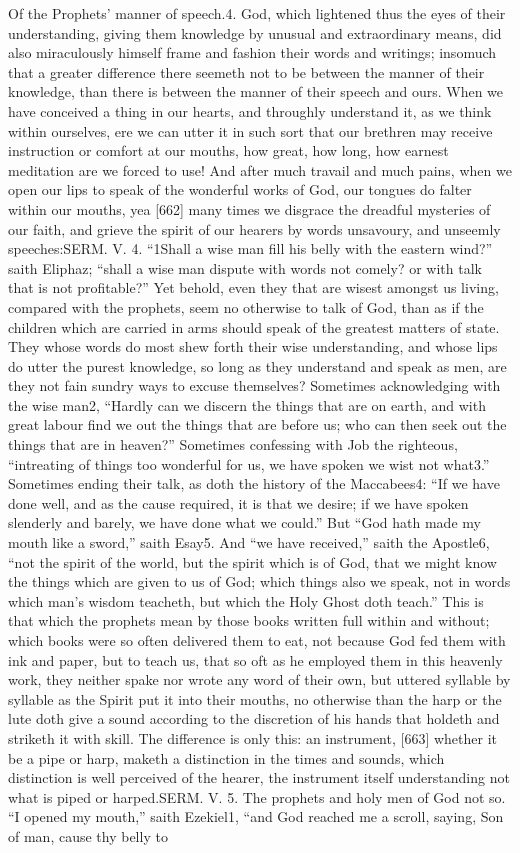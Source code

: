 Of the Prophets’ manner of speech.4. God, which lightened thus the eyes of their understanding, giving them knowledge by unusual and extraordinary means, did also miraculously himself frame and fashion their words and writings; insomuch that a greater difference there seemeth not to be between the manner of their knowledge, than there is between the manner of their speech and ours. When we have conceived a thing in our hearts, and throughly understand it, as we think within ourselves, ere we can utter it in such sort that our brethren may receive instruction or comfort at our mouths, how great, how long, how earnest meditation are we forced to use! And after much travail and much pains, when we open our lips to speak of the wonderful works of God, our tongues do falter within our mouths, yea [662] many times we disgrace the dreadful mysteries of our faith, and grieve the spirit of our hearers by words unsavoury, and unseemly speeches:SERM. V. 4. “1Shall a wise man fill his belly with the eastern wind?” saith Eliphaz; “shall a wise man dispute with words not comely? or with talk that is not profitable?” Yet behold, even they that are wisest amongst us living, compared with the prophets, seem no otherwise to talk of God, than as if the children which are carried in arms should speak of the greatest matters of state. They whose words do most shew forth their wise understanding, and whose lips do utter the purest knowledge, so long as they understand and speak as men, are they not fain sundry ways to excuse themselves? Sometimes acknowledging with the wise man2, “Hardly can we discern the things that are on earth, and with great labour find we out the things that are before us; who can then seek out the things that are in heaven?” Sometimes confessing with Job the righteous, “intreating of things too wonderful for us, we have spoken we wist not what3.” Sometimes ending their talk, as doth the history of the Maccabees4: “If we have done well, and as the cause required, it is that we desire; if we have spoken slenderly and barely, we have done what we could.” But “God hath made my mouth like a sword,” saith Esay5. And “we have received,” saith the Apostle6, “not the spirit of the world, but the spirit which is of God, that we might know the things which are given to us of God; which things also we speak, not in words which man’s wisdom teacheth, but which the Holy Ghost doth teach.” This is that which the prophets mean by those books written full within and without; which books were so often delivered them to eat, not because God fed them with ink and paper, but to teach us, that so oft as he employed them in this heavenly work, they neither spake nor wrote any word of their own, but uttered syllable by syllable as the Spirit put it into their mouths, no otherwise than the harp or the lute doth give a sound according to the discretion of his hands that holdeth and striketh it with skill. The difference is only this: an instrument, [663] whether it be a pipe or harp, maketh a distinction in the times and sounds, which distinction is well perceived of the hearer, the instrument itself understanding not what is piped or harped.SERM. V. 5. The prophets and holy men of God not so. “I opened my mouth,” saith Ezekiel1, “and God reached me a scroll, saying, Son of man, cause thy belly to 